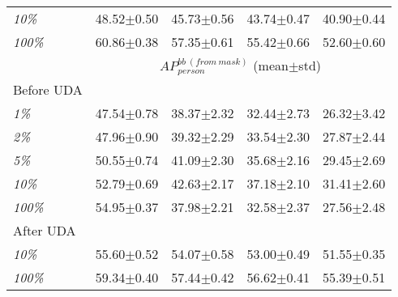 \begin{table}[bt!]
{\begin{tabular}{l|cccc}
			\emph{10\%}             & 48.52$\pm$0.50                                                                                        & 45.73$\pm$0.56 & 43.74$\pm$0.47 & 40.90$\pm$0.44 \Tstrut  \\
			\emph{100\%}            & 60.86$\pm$0.38                                                                                        & 57.35$\pm$0.61 & 55.42$\pm$0.66 & 52.60$\pm$0.60 \Tstrut  \\
			\hline
			                        & \multicolumn{4}{c}{$\mathit{AP_{person}^{bb\ (from\ mask)}}$ (mean$\pm$std)} \Tstrut \Bstrut                                                             \\
			\hline
			Before UDA              &                                                                                                       &                & \Tstrut                                  \\
			\emph{1\%}              & 47.54$\pm$0.78                                                                                        & 38.37$\pm$2.32 & 32.44$\pm$2.73 & 26.32$\pm$3.42 \Tstrut  \\
			\emph{2\%}              & 47.96$\pm$0.90                                                                                        & 39.32$\pm$2.29 & 33.54$\pm$2.30 & 27.87$\pm$2.44 \Tstrut  \\
			\emph{5\%}              & 50.55$\pm$0.74                                                                                        & 41.09$\pm$2.30 & 35.68$\pm$2.16 & 29.45$\pm$2.69 \Tstrut  \\
			\emph{10\%}             & 52.79$\pm$0.69                                                                                        & 42.63$\pm$2.17 & 37.18$\pm$2.10 & 31.41$\pm$2.60 \Tstrut  \\
			\emph{100\%}            & 54.95$\pm$0.37                                                                                        & 37.98$\pm$2.21 & 32.58$\pm$2.37 & 27.56$\pm$2.48 \Tstrut  \\\hline
			After UDA               &                                                                                                       &                & \Tstrut                                  \\
			\emph{10\%}             & 55.60$\pm$0.52                                                                                        & 54.07$\pm$0.58 & 53.00$\pm$0.49 & 51.55$\pm$0.35 \Tstrut  \\
			\emph{100\%}            & 59.34$\pm$0.40                                                                                        & 57.44$\pm$0.42 & 56.62$\pm$0.41 & 55.39$\pm$0.51 \Tstrut  \\
			\hline
		\end{tabular}
	}
	\label{table:init-exps}
	\vspace{-1mm}
\end{table}

